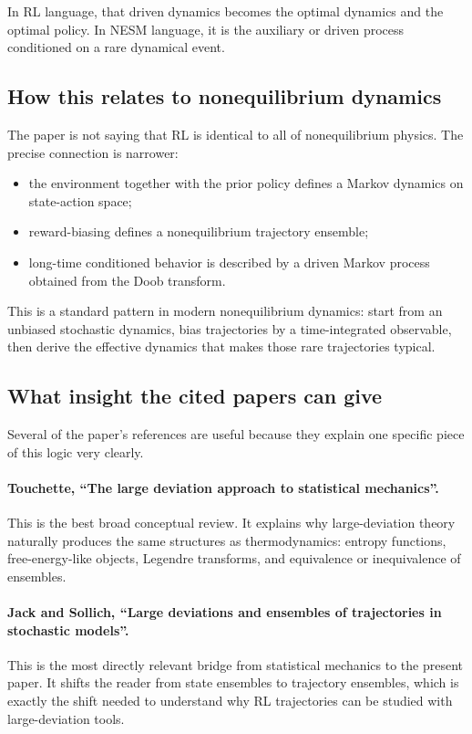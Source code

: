 \documentclass[11pt]{article}
\begin{document}
In RL language, that driven dynamics becomes the optimal dynamics and the optimal policy.
In NESM language, it is the auxiliary or driven process conditioned on a rare dynamical
event.

\subsection*{How this relates to nonequilibrium dynamics}

The paper is not saying that RL is identical to all of nonequilibrium physics. The precise
connection is narrower:
\begin{itemize}
    \item the environment together with the prior policy defines a Markov dynamics on
    state-action space;
    \item reward-biasing defines a nonequilibrium trajectory ensemble;
    \item long-time conditioned behavior is described by a driven Markov process obtained from
    the Doob transform.
\end{itemize}

This is a standard pattern in modern nonequilibrium dynamics: start from an unbiased
stochastic dynamics, bias trajectories by a time-integrated observable, then derive the
effective dynamics that makes those rare trajectories typical.

\subsection*{What insight the cited papers can give}

Several of the paper's references are useful because they explain one specific piece of this
logic very clearly.

\paragraph{Touchette, ``The large deviation approach to statistical mechanics''.}
This is the best broad conceptual review. It explains why large-deviation theory naturally
produces the same structures as thermodynamics: entropy functions, free-energy-like objects,
Legendre transforms, and equivalence or inequivalence of ensembles.

\paragraph{Jack and Sollich, ``Large deviations and ensembles of trajectories in stochastic models''.}
This is the most directly relevant bridge from statistical mechanics to the present paper. It
shifts the reader from state ensembles to trajectory ensembles, which is exactly the shift
needed to understand why RL trajectories can be studied with large-deviation tools.
\end{document}
